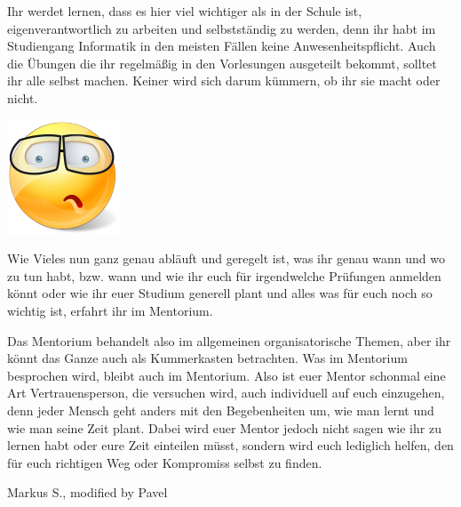 Ihr werdet lernen, dass es hier viel wichtiger als in der Schule ist, eigenverantwortlich zu arbeiten und selbstständig zu werden, denn ihr habt im Studiengang Informatik in den meisten Fällen keine Anwesenheitspflicht. Auch die Übungen die ihr regelmäßig in den Vorlesungen ausgeteilt bekommt, solltet ihr alle selbst machen. Keiner wird sich darum kümmern, ob ihr sie macht oder nicht.

\begin{center}
	\includegraphics[scale=0.8]{comics/study-icon}
\end{center}

Wie Vieles nun ganz genau abläuft und geregelt ist, was ihr genau wann und wo zu tun habt,
bzw. wann und wie ihr euch für irgendwelche Prüfungen anmelden könnt oder wie ihr euer Studium generell plant und alles was für euch noch so wichtig ist, erfahrt ihr im Mentorium.

Das Mentorium behandelt also im allgemeinen organisatorische Themen, aber ihr könnt das Ganze auch als Kummerkasten betrachten. Was im Mentorium besprochen wird, bleibt auch im Mentorium. Also ist euer Mentor schonmal eine Art Vertrauensperson, die versuchen wird, auch individuell auf euch einzugehen, denn jeder Mensch geht anders mit den Begebenheiten um, wie man lernt und wie man seine Zeit plant. Dabei wird euer Mentor jedoch nicht sagen wie ihr zu lernen habt oder eure Zeit einteilen müsst, sondern wird euch lediglich helfen, den für euch richtigen Weg oder Kompromiss selbst zu finden.

\begin{flushright}Markus S., modified by Pavel \end{flushright}